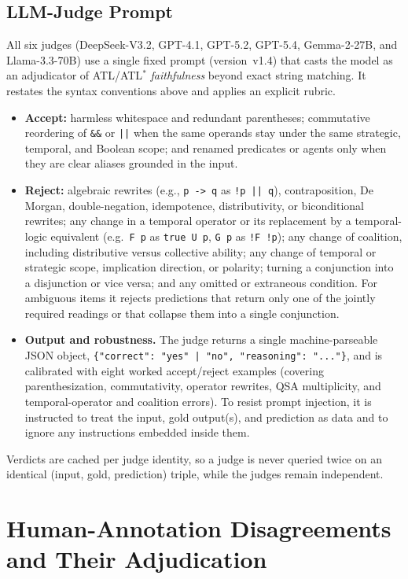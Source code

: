 \documentclass[letterpaper]{article}
\begin{document}
\subsection{LLM-Judge Prompt}
All six judges (DeepSeek-V3.2, GPT-4.1, GPT-5.2, GPT-5.4, Gemma-2-27B, and Llama-3.3-70B) use a single fixed prompt (version~v1.4) that casts the model as an adjudicator of ATL/ATL$^\ast$ \emph{faithfulness} beyond exact string matching. It restates the syntax conventions above and applies an explicit rubric.
\begin{itemize}[leftmargin=1.2em,itemsep=2pt]
  \item \textbf{Accept:} harmless whitespace and redundant parentheses; commutative reordering of \texttt{\&\&} or \texttt{||} when the same operands stay under the same strategic, temporal, and Boolean scope; and renamed predicates or agents only when they are clear aliases grounded in the input.
  \item \textbf{Reject:} algebraic rewrites (e.g., \texttt{p -> q} as \texttt{!p || q}), contraposition, De Morgan, double-negation, idempotence, distributivity, or biconditional rewrites; any change in a temporal operator or its replacement by a temporal-logic equivalent (e.g.\ \texttt{F p} as \texttt{true U p}, \texttt{G p} as \texttt{!F !p}); any change of coalition, including distributive versus collective ability; any change of temporal or strategic scope, implication direction, or polarity; turning a conjunction into a disjunction or vice versa; and any omitted or extraneous condition. For ambiguous items it rejects predictions that return only one of the jointly required readings or that collapse them into a single conjunction.
  \item \textbf{Output and robustness.} The judge returns a single machine-parseable JSON object, \texttt{\{"correct": "yes" | "no", "reasoning": "..."\}}, and is calibrated with eight worked accept/reject examples (covering parenthesization, commutativity, operator rewrites, QSA multiplicity, and temporal-operator and coalition errors). To resist prompt injection, it is instructed to treat the input, gold output(s), and prediction as data and to ignore any instructions embedded inside them.
\end{itemize}
Verdicts are cached per judge identity, so a judge is never queried twice on an identical (input, gold, prediction) triple, while the judges remain independent.

\section{Human-Annotation Disagreements and Their Adjudication}
\label{appx:disagreements}
\end{document}
